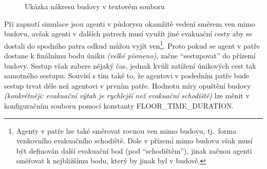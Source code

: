 \documentclass[czech,public,dept460,male,cpdeclaration]{diploma}
\begin{document}
\begin{figure}[H]
	\centering
	\hfill
	\caption{Ukázka nákresu budovy v textovém souboru} \label{fig:mapatxt}
\end{figure}

	



Při zapnutí simulace jsou agenti v půdorysu okamžitě vedení směrem ven mimo budovu, avšak agenti v dalších patrech musí využít jiné evakuační cesty aby se dostali do spodního patra odkud můžou vyjít ven\footnote{Agenty v patře lze také směrovat rovnou ven mimo budovu, tj.~forma venkovního evakuačního schodiště. Dole v přízemí mimo budovu však musí být definován další evakuační bod (pod ``schodištěm''), jinak začnou agenti směřovat k nejbližšímu bodu, který by jinak byl v budově.}. Proto pokud se agent v patře dostane k finálnímu bodu úniku \textit{(velké písmeno)}, začne ``sestupovat'' do přízemí budovy. Sestup však zabere nějaký čas, jednak kvůli zatížení únikových cest tak samotného sestupu. Souvisí s tím také to, že agentovi v posledním patře bude sestup trvat déle než agentovi v prvním patře. Hodnotu míry opuštění budovy \textit{(konkrétněji: evakuační výtah je rychlejší než evakuační schodiště)} lze měnit v konfiguračním souboru pomocí konstanty FLOOR\_TIME\_DURATION.
\end{document}
